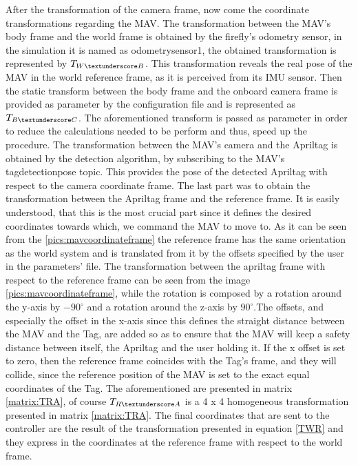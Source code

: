 After the transformation of the camera frame, now come the coordinate transformations regarding the MAV. The transformation between the MAV's body frame and the world frame is obtained by the firefly's odometry sensor, in the simulation it is named as odometry\textunderscore sensor1, the obtained transformation is represented by $T_{W\textunderscore B}$. This transformation reveals the real pose of the MAV in the world reference frame, as it is perceived from its IMU sensor. Then the static transform between the body frame and the onboard camera frame is provided as parameter by the configuration file and is represented as $T_{B\textunderscore C}$. The aforementioned transform is passed as parameter in order to reduce the calculations needed to be perform and thus, speed up the procedure. The transformation between the MAV's camera and the Apriltag is obtained by the detection algorithm, by subscribing to the MAV's  tag\textunderscore detection\textunderscore pose topic. This provides the pose of the detected Apriltag with respect to the camera coordinate frame. The last part was to obtain the transformation between the Apriltag frame and the reference frame. It is  easily understood, that this is the most crucial part since it defines the desired coordinates towards which, we command the MAV to move to. As it can be seen from the \ref{pics:mavcoordinateframe} the reference frame has the same orientation as the world system and is translated from it by the offsets specified by the user in the parameters' file. The transformation between the apriltag frame with respect to the reference frame can be seen from the image \ref{pics:mavcoordinateframe}, while the rotation is composed by a rotation around the y-axis by $-90^{\circ}$ and a rotation around the z-axis by $90^{\circ}$.The offsets, and especially the offset in the x-axis since this defines the straight distance between the MAV and the Tag, are added so as to ensure that the MAV will keep a safety distance between itself, the Apriltag and the user holding it. If the x offset is set to zero, then the reference frame coincides with the Tag's frame, and they will collide, since the reference position of the MAV is set to the exact equal coordinates of the Tag. The aforementioned are presented in matrix \ref{matrix:TRA}, of course $T_{R\textunderscore A}$ is a 4 x 4 homogeneous transformation presented in matrix \ref{matrix:TRA}. The final coordinates that are sent to the controller are the result of the transformation presented in equation \ref{TWR} and they express in the coordinates at the reference frame with respect to the world frame.
 


